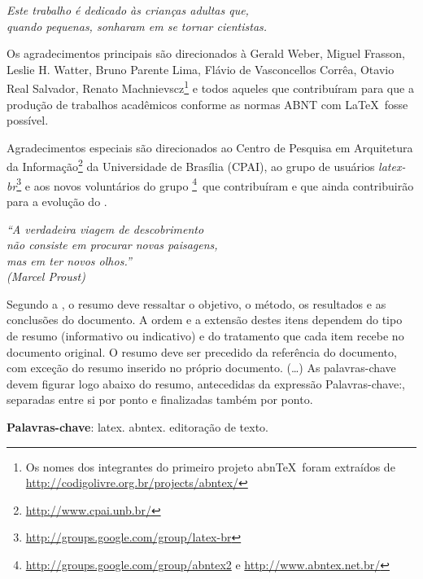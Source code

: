 \documentclass[
	12pt,				%
	openright,			%
	oneside,			%
	a4paper,			%
	chapter=TITLE,		%
	english,			%
	french,				%
	spanish,			%
	brazil				%
	]{abntex2}
\theoremstyle{definition}
\begin{document}
\begin{dedicatoria}
   \vspace*{\fill}
   \begin{flushright}
	   \noindent
	   \textit{Este trabalho é dedicado às crianças adultas que,\\
	   quando pequenas, sonharam em se tornar cientistas.}
	 \end{flushright}
\end{dedicatoria}

\begin{agradecimentos}
Os agradecimentos principais são direcionados à Gerald Weber, Miguel Frasson,
Leslie H. Watter, Bruno Parente Lima, Flávio de Vasconcellos Corrêa, Otavio Real
Salvador, Renato Machnievscz\footnote{Os nomes dos integrantes do primeiro
projeto abn\TeX\ foram extraídos de
\url{http://codigolivre.org.br/projects/abntex/}} e todos aqueles que
contribuíram para que a produção de trabalhos acadêmicos conforme
as normas ABNT com \LaTeX\ fosse possível.

Agradecimentos especiais são direcionados ao Centro de Pesquisa em Arquitetura
da Informação\footnote{\url{http://www.cpai.unb.br/}} da Universidade de
Brasília (CPAI), ao grupo de usuários
\emph{latex-br}\footnote{\url{http://groups.google.com/group/latex-br}} e aos
novos voluntários do grupo
\emph{\abnTeX}\footnote{\url{http://groups.google.com/group/abntex2} e
\url{http://www.abntex.net.br/}}~que contribuíram e que ainda
contribuirão para a evolução do \abnTeX.

\end{agradecimentos}

\begin{epigrafe}
    \vspace*{\fill}
	\begin{flushright}
		\textit{``A verdadeira viagem de descobrimento
        \\não consiste em procurar novas paisagens,
        \\mas em ter novos olhos.''\\
		(Marcel Proust)}
	\end{flushright}
\end{epigrafe}


\setlength{\absparsep}{18pt} %
\begin{resumo}
Segundo a , o resumo deve ressaltar o
 objetivo, o método, os resultados e as conclusões do documento. A ordem e a extensão destes itens dependem do tipo de resumo (informativo ou indicativo) e do tratamento que cada item recebe no documento original. O resumo deve ser precedido da referência do documento, com exceção do resumo inserido no próprio documento. (\ldots) As palavras-chave devem figurar logo abaixo do resumo, antecedidas da expressão Palavras-chave:, separadas entre si por ponto e finalizadas também por ponto.

 \textbf{Palavras-chave}: latex. abntex. editoração de texto.
\end{resumo}
\end{document}
